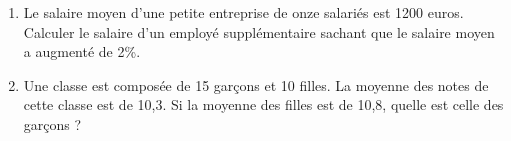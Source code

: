 
\begin{enumerate} 
\item Le salaire moyen d'une petite entreprise de onze salariés est 1200 euros. Calculer le salaire d'un employé supplémentaire sachant que le salaire moyen a augmenté de 2\%.
\item Une classe est composée de 15 garçons et 10 filles. La moyenne des notes de cette classe est de 10,3. Si la moyenne des filles est de 10,8, quelle est celle des garçons ?
\end{enumerate}